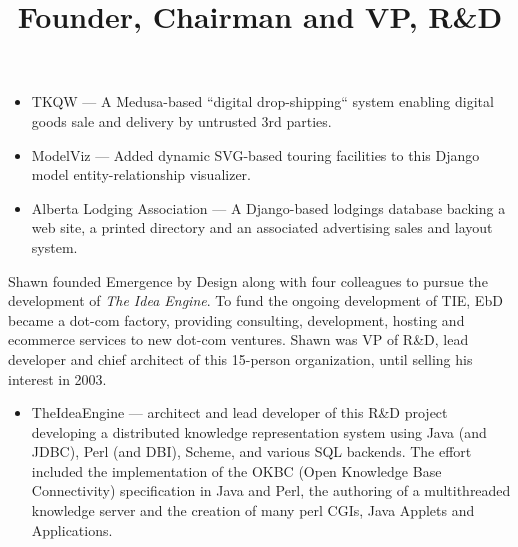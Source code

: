 \begin{resume}
\begin{position}
\begin{itemize}
  \item TKQW --- A Medusa-based ``digital drop-shipping`` system
  enabling digital goods sale and delivery by untrusted 3rd parties.

  \item ModelViz --- Added dynamic SVG-based touring facilities to this Django
  model entity-relationship visualizer.

  \item Alberta Lodging Association --- A Django-based lodgings database 
  backing a web site, a printed directory and an associated advertising 
  sales and layout system.

\end{itemize}

\end{position}




\title{ Founder, Chairman and VP, R\&D }

\begin{position}
  Shawn founded Emergence by Design along with four colleagues to pursue
  the development of \emph{The Idea Engine}.  To fund the ongoing development of
  TIE, EbD became a dot-com factory, providing consulting,
  development, hosting and ecommerce services to new dot-com ventures.
  Shawn was VP of R\&D, lead developer and chief architect of this 15-person
  organization, until selling his interest in 2003.

\begin{itemize}

\item TheIdeaEngine --- architect and lead developer of this R\&D project 
  developing a distributed knowledge representation system using 
  Java (and JDBC), Perl (and DBI), Scheme, and various SQL backends.  
  The effort included the
  implementation of the OKBC (Open Knowledge Base Connectivity)
  specification in Java and Perl,
  the authoring of a multithreaded knowledge server
  and the creation of many perl CGIs, Java Applets and Applications.


\end{itemize}
\end{position}
\end{resume}
